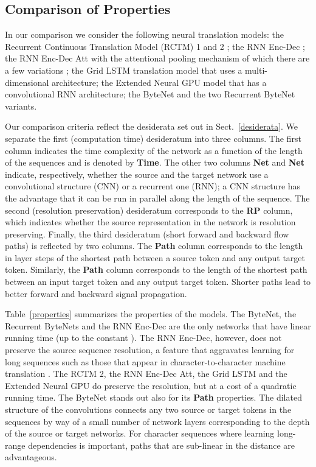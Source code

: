 \documentclass{article}
\begin{document}
\subsection{Comparison of Properties}

In our comparison we consider the following neural translation models: the Recurrent Continuous Translation Model (RCTM) 1 and 2 \citep{kalchbrenner13emnlp}; the RNN Enc-Dec \citep{DBLP:conf/nips/SutskeverVL14,DBLP:journals/corr/ChoMGBSB14}; the RNN Enc-Dec Att with the attentional pooling mechanism \citep{DBLP:journals/corr/BahdanauCB14} of which there are a few variations \citep{luong-pham-manning:2015:EMNLP,chung2016hierarchical}; the Grid LSTM translation model \citep{DBLP:journals/corr/KalchbrennerDG15} that uses a multi-dimensional architecture; the Extended Neural GPU model \citep{kaiser2016active} that has a convolutional RNN architecture; the ByteNet and the two Recurrent ByteNet variants.


Our comparison criteria reflect the desiderata set out in Sect.~\ref{desiderata}.
We separate the first (computation time) desideratum into three columns. The first column indicates the time complexity of the network as a function of the length of the sequences and is denoted by \textbf{Time}. The other two columns \textbf{Net} and \textbf{Net} indicate, respectively, whether the source and the target network use a convolutional structure (CNN) or a recurrent one (RNN); a CNN structure has the advantage that it can be run in parallel along the length of the sequence. 
The second (resolution preservation) desideratum corresponds to the \textbf{RP} column, which indicates whether the source representation in the network is resolution preserving. 
Finally, the third desideratum (short forward and backward flow paths) is reflected by two columns.
The \textbf{Path} column corresponds to the length in layer steps of the shortest path between a source token and any output target token. Similarly, the \textbf{Path} column corresponds to the length of the shortest path between an input target token and any output target token. 
Shorter paths lead to better forward and backward signal propagation.

Table~\ref{properties} summarizes the properties of the models. The ByteNet, the Recurrent ByteNets and the RNN Enc-Dec are the only networks that have linear running time (up to the constant ). The RNN Enc-Dec, however, does not preserve the source sequence resolution, a feature that aggravates learning for long sequences such as those that appear in character-to-character machine translation  \citep{DBLP:conf/acl/LuongM16}. The RCTM 2, the RNN Enc-Dec Att, the Grid LSTM and the Extended Neural GPU do preserve the resolution, but at a cost of a quadratic running time. The ByteNet stands out also for its \textbf{Path} properties. The dilated structure of the convolutions connects any two source or target tokens in the sequences by way of a small number of network layers corresponding to the depth of the source or target networks. For character sequences where learning long-range dependencies is important, paths that are sub-linear in the distance are advantageous. 
\end{document}
